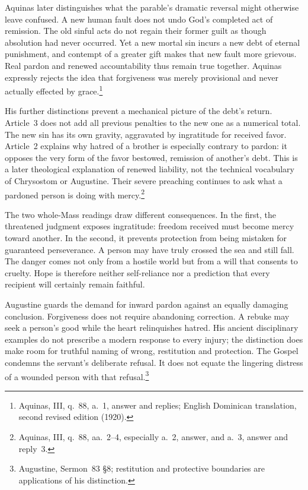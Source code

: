 Aquinas later distinguishes what the parable's dramatic reversal might otherwise leave confused. A new human fault does not undo God's completed act of remission. The old sinful acts do not regain their former guilt as though absolution had never occurred. Yet a new mortal sin incurs a new debt of eternal punishment, and contempt of a greater gift makes that new fault more grievous. Real pardon and renewed accountability thus remain true together. Aquinas expressly rejects the idea that forgiveness was merely provisional and never actually effected by grace.\footnote{Aquinas,  III, q.~88, a.~1, answer and replies; English Dominican translation, second revised edition (1920).}

His further distinctions prevent a mechanical picture of the debt's return. Article~3 does not add all previous penalties to the new one as a numerical total. The new sin has its own gravity, aggravated by ingratitude for received favor. Article~2 explains why hatred of a brother is especially contrary to pardon: it opposes the very form of the favor bestowed, remission of another's debt. This is a later theological explanation of renewed liability, not the technical vocabulary of Chrysostom or Augustine. Their severe preaching continues to ask what a pardoned person is doing with mercy.\footnote{Aquinas, III, q.~88, aa.~2--4, especially a.~2, answer, and a.~3, answer and reply~3.}

The two whole-Mass readings draw different consequences. In the first, the threatened judgment exposes ingratitude: freedom received must become mercy toward another. In the second, it prevents protection from being mistaken for guaranteed perseverance. A person may have truly crossed the sea and still fall. The danger comes not only from a hostile world but from a will that consents to cruelty. Hope is therefore neither self-reliance nor a prediction that every recipient will certainly remain faithful.

Augustine guards the demand for inward pardon against an equally damaging conclusion. Forgiveness does not require abandoning correction. A rebuke may seek a person's good while the heart relinquishes hatred. His ancient disciplinary examples do not prescribe a modern response to every injury; the distinction does make room for truthful naming of wrong, restitution and protection. The Gospel condemns the servant's deliberate refusal. It does not equate the lingering distress of a wounded person with that refusal.\footnote{Augustine, Sermon~83 \S8; restitution and protective boundaries are applications of his distinction.}

